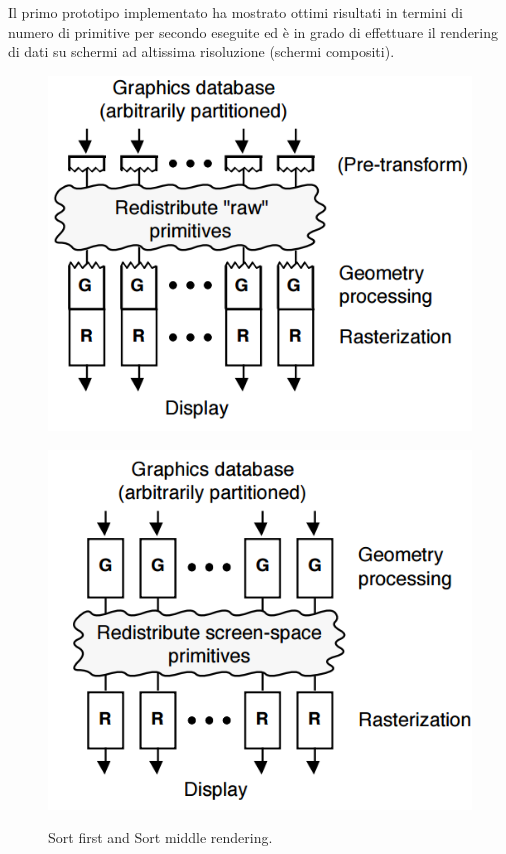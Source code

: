 \documentclass[a4paper,11pt]{paper}
\begin{document}
Il primo prototipo implementato ha mostrato ottimi risultati in termini di numero di primitive per secondo eseguite ed è in grado di effettuare il rendering di dati su schermi ad altissima risoluzione (schermi compositi). 



\begin{figure}
  \centering
  \begin{minipage}{0.4\textwidth}
    \includegraphics[scale=0.28]{sortfirst}      
    \label{fig:sf}
  \end{minipage}
  \hfill
  \begin{minipage}{0.4\textwidth}
    \includegraphics[scale=0.28]{sortmiddle}
   \label{fig:sm}
  \end{minipage}
    \caption{Sort first and Sort middle rendering.}\label{fig:sfsm}
\end{figure}
\end{document}
